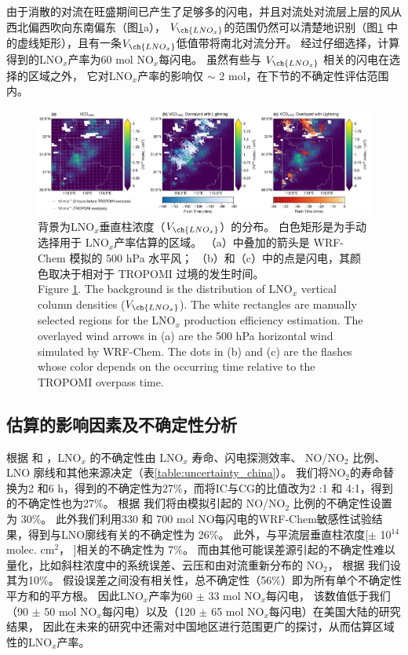 由于消散的对流在旺盛期间已产生了足够多的闪电，并且对流处对流层上层的风从西北偏西吹向东南偏东（图\ref{fig:china_vcd_lnox}a），
$V_{\ch{LNO_x}}$的范围仍然可以清楚地识别（图\ref{fig:china_vcd_lnox} 中的虚线矩形），且有一条$V_{\ch{LNO_x}}$低值带将南北对流分开。
经过仔细选择，计算得到的LNO$_x$产率为60 mol NO$_x$每闪电。
虽然有些与 $V_{\ch{LNO_x}}$ 相关的闪电在选择的区域之外，
它对LNO$_x$产率的影响仅 $\sim$ 2 mol，在下节的不确定性评估范围内。


\begin{figure}[H]
    \centering
    \includegraphics[width=\textwidth]{./figures/china_vcd_lnox.png}
    \caption{
    背景为LNO$_x$垂直柱浓度（$V_{\ch{LNO_x}}$）的分布。
     白色矩形是为手动选择用于 LNO$_x$产率估算的区域。
     （a）中叠加的箭头是 WRF-Chem 模拟的 500 hPa 水平风；
     （b）和（c）中的点是闪电，其颜色取决于相对于 TROPOMI 过境的发生时间。\\
    Figure \ref{fig:china_vcd_lnox}. The background is the distribution of LNO$_x$ vertical column densities ($V_{\ch{LNO_x}}$).
    The white rectangles are manually selected regions for the LNO$_x$ production efficiency estimation.
    The overlayed wind arrows in (a) are the 500 hPa horizontal wind simulated by WRF-Chem.
    The dots in (b) and (c) are the flashes whose color depends on the occurring time relative to the TROPOMI overpass time.
    }
    \label{fig:china_vcd_lnox}
\end{figure}


\subsection{估算的影响因素及不确定性分析} \label{sec:uncertainty_china}

根据 \citet{Allen.2019} 和 \citet{Zhang.2020b}，LNO$_x$ 的不确定性由 LNO$_x$ 寿命、闪电探测效率、
NO/NO$_2$ 比例、LNO 廓线和其他来源决定（表\ref{table:uncertainty_china}）。
我们将NO$_2$的寿命替换为2 和6 h，得到的不确定性为27\%，而将IC与CG的比值改为2 :1 和 4:1，得到的不确定性也为27\%。
根据 \citet{Allen.2019} 我们将由模拟引起的 NO/NO$_2$ 比例的不确定性设置为 30\%。
此外我们利用330 和 700 mol NO每闪电的WRF-Chem敏感性试验结果，得到与LNO廓线有关的不确定性为 26\%。
此外，与平流层垂直柱浓度[$\pm$ 10$^{14}$ molec. cm$^2$， \citet{VanGeffen.2022}]相关的不确定性为 7\%。
而由其他可能误差源引起的不确定性难以量化，比如斜柱浓度中的系统误差、云压和由对流重新分布的 NO$_2$，
根据 \citet{Allen.2021a}我们设其为10\%。
假设误差之间没有相关性，总不确定性（56\%）即为所有单个不确定性平方和的平方根。
因此LNO$_x$产率为60 $\pm$ 33 mol NO$_x$每闪电，
该数值低于我们（90 $\pm$ 50 mol NO$_x$每闪电）以及\citet{Allen.2021a}（120 $\pm$ 65 mol NO$_x$每闪电）在美国大陆的研究结果，
因此在未来的研究中还需对中国地区进行范围更广的探讨，从而估算区域性的LNO$_x$产率。


